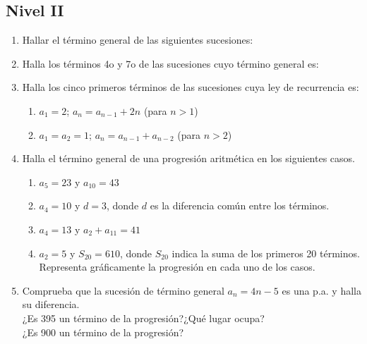 \documentclass[twoside]{article}
\begin{document}
\subsection*{Nivel II}
\begin{enumerate}
\item Hallar el término general de las siguientes sucesiones:
\begin{enumerate}
\end{enumerate}
\item Halla los términos 4o y 7o de las sucesiones cuyo término general es:
\begin{enumerate}
\end{enumerate}
\item Halla los cinco primeros términos de las sucesiones cuya ley de recurrencia es:
\begin{enumerate}
\item $a_{1}=2$; $a_{n}=a_{n-1}+2n$ (para $n>1$)
\item $a_{1}=a_{2}=1$; $a_{n}=a_{n-1}+a_{n-2}$ (para $n>2$)
\end{enumerate}
\item Halla el término general de una progresión aritmética en los siguientes casos.
\begin{enumerate}
\item $a_{5}=23$ y $a_{10}=43$
\item $a_{4}=10$ y $d=3$, donde $d$ es la diferencia común entre los términos.
\item $a_{4}=13$ y $a_{2}+a_{11}=41$
\item $a_{2}=5$ y $S_{20}=610$, donde $S_{20}$ indica la suma de los primeros 20 términos.\\
Representa gráficamente la progresión en cada uno de los casos.
\end{enumerate}
\item Comprueba que la sucesión de término general $a_n = 4n - 5$ es una p.a. y halla su diferencia.\\
¿Es 395 un término de la progresión?¿Qué lugar ocupa?\\
¿Es 900 un término de la progresión?
\end{enumerate}
\end{document}

